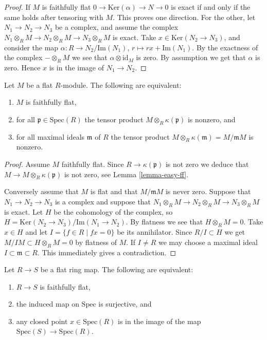 \begin{proof}
If $M$ is faithfully flat $0 \to \text{Ker}(\alpha)
\to N \to 0$ is exact if and only if the same holds
after tensoring with $M$. This proves one direction.
For the other, let $N_1 \to N_2 \to N_3$
be a complex, and assume the complex
$N_1 \otimes_R M \to N_2 \otimes_R M \to N_3\otimes_R M$
is exact. Take $x \in \text{Ker}(N_2 \to N_3)$,
and consider the map $\alpha : R\to N_2/\text{Im}(N_1)$,
$r \mapsto rx + \text{Im}(N_1)$. By the exactness
of the complex $-\otimes_R M$ we see that $\alpha \otimes 
\text{id}_M$ is zero. By assumption we get that $\alpha$ is
zero. Hence $x $ is in the image of $N_1 \to N_2$.
\end{proof}

\begin{lemma}
\label{lemma-ff}
Let $M$ be a flat $R$-module.
The following are equivalent:
\begin{enumerate}
\item $M$ is faithfully flat,
\item for all $\mathfrak p \in \text{Spec}(R)$
the tensor product $M\otimes_R \kappa(\mathfrak p)$ is nonzero, and
\item for all maximal ideals $\mathfrak m$ of $R$
the tensor product $M\otimes_R \kappa(\mathfrak m) = M/{\mathfrak m}M$
is nonzero.
\end{enumerate}
\end{lemma}

\begin{proof}
Assume $M$ faithfully flat. Since $R \to \kappa({\mathfrak p})$ is not
zero we deduce that $M \to M \otimes_R \kappa({\mathfrak p})$ is not zero,
see Lemma \ref{lemma-easy-ff}.

\medskip\noindent
Conversely assume that $M$ is flat and that
$M/{\mathfrak m}M$ is never zero.
Suppose that $N_1 \to N_2 \to N_3$ is a complex and
suppose that $N_1 \otimes_R M \to N_2\otimes_R M \to
N_3\otimes_R M$ is exact. Let $H$ be the cohomology of the complex,
so $H = \text{Ker}(N_2 \to N_3)/\text{Im}(N_1 \to N_2)$.
By flatness we see that $H \otimes_R M = 0$. 
Take $x \in H$ and let $I = \{f \in R \mid fx = 0 \}$
be its annihilator. Since $R/I \subset H$ we get
$M/IM \subset H\otimes_R M = 0$ by flatness of $M$.
If $I \not=  R$ we may choose
a maximal ideal $I \subset \mathfrak m \subset R$.
This immediately gives a contradiction.
\end{proof}

\begin{lemma}
\label{lemma-ff-rings}
Let $R \to S$ be a flat ring map.
The following are equivalent:
\begin{enumerate}
\item $R \to S$ is faithfully flat,
\item the induced map on $\text{Spec}$ is surjective, and
\item any closed point $x \in \text{Spec}(R)$ is
in the image of the map $\text{Spec}(S) \to \text{Spec}(R)$.
\end{enumerate}
\end{lemma}

